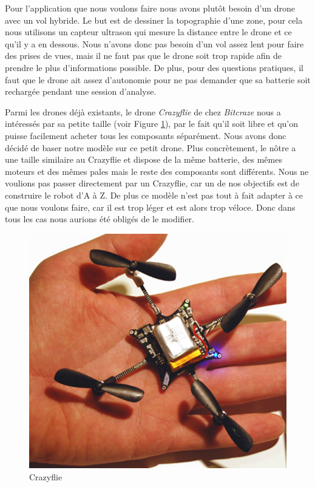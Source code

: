 \documentclass[a4paper,10pt]{report}
\begin{document}
    Pour l'application que nous voulons faire nous avons plutôt besoin d'un drone avec un vol hybride. Le but est de dessiner la 
    topographie d'une zone, pour cela nous utilisons un capteur ultrason qui mesure la distance entre le drone et ce qu'il y a en 
    dessous. Nous n'avons donc pas besoin d'un vol assez lent pour faire des prises de vues, mais il ne faut pas que le drone soit 
    trop rapide afin de prendre le plus d'informations possible. De plus, pour des questions pratiques, il faut que le
    drone ait assez d'autonomie pour ne pas demander que sa batterie soit rechargée pendant une session d'analyse.
    
    Parmi les drones déjà existants, le drone \textit{Crazyflie} de chez \textit{Bitcraze}\cite{bitcraze} nous a intéressés par sa
    petite taille (voir Figure \ref{crazyflie}), par le fait qu'il soit libre et qu'on puisse facilement acheter tous les composants 
    séparément. Nous avons donc décidé de baser notre modèle sur ce petit drone. Plus concrètement, le nôtre a une taille similaire
    au Crazyflie et dispose de la même batterie, des mêmes moteurs et des mêmes pales mais le reste des composants sont différents.
    Nous ne voulions pas passer directement par un Crazyflie, car un de nos objectifs est de construire le robot d'A à Z. De plus ce
    modèle n'est pas tout à fait adapter à ce que nous voulons faire, car il est trop léger et est alors trop véloce. 
    Donc dans tous les cas nous aurions été obligés de le modifier.
    
    \begin{figure}[htbp]%
      \centering
      \includegraphics[scale = 0.25]{img/crazyflie.png}
      \caption{Crazyflie}
      \label{crazyflie}
    \end{figure}
    
\end{document}
